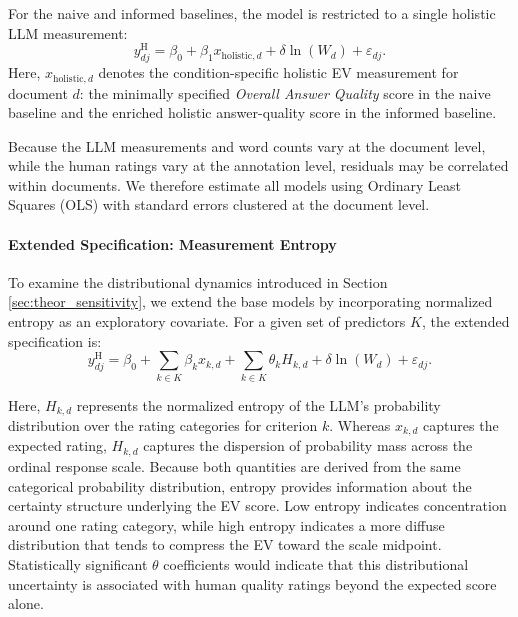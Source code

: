 For the naive and informed baselines, the model is restricted to a single holistic LLM measurement:
\begin{equation}\label{eq:feedbackqa_baseline_regression}
    y^{\text{H}}_{dj} = \beta_0 + \beta_1 x_{\text{holistic}, d} + \delta \ln(W_d) + \varepsilon_{dj}.
\end{equation}
Here, $x_{\text{holistic},d}$ denotes the condition-specific holistic EV measurement for document $d$: the minimally specified \textit{Overall Answer Quality} score in the naive baseline and the enriched holistic answer-quality score in the informed baseline.

Because the LLM measurements and word counts vary at the document level, while the human ratings vary at the annotation level, residuals may be correlated within documents. We therefore estimate all models using Ordinary Least Squares (OLS) with standard errors clustered at the document level.


\paragraph{Extended Specification: Measurement Entropy}
To examine the distributional dynamics introduced in Section \ref{sec:theor_sensitivity}, we extend the base models by incorporating normalized entropy as an exploratory covariate. For a given set of predictors $K$, the extended specification is:
\begin{equation}\label{eq:feedbackqa_extended_regression}
    y^{\text{H}}_{dj} = \beta_0 + \sum_{k \in K} \beta_k x_{k, d} + \sum_{k \in K} \theta_k H_{k, d} + \delta \ln(W_d) + \varepsilon_{dj}.
\end{equation}

Here, $H_{k,d}$ represents the normalized entropy of the LLM's probability distribution over the rating categories for criterion $k$. Whereas $x_{k,d}$ captures the expected rating, $H_{k,d}$ captures the dispersion of probability mass across the ordinal response scale. Because both quantities are derived from the same categorical probability distribution, entropy provides information about the certainty structure underlying the EV score. Low entropy indicates concentration around one rating category, while high entropy indicates a more diffuse distribution that tends to compress the EV toward the scale midpoint. Statistically significant $\theta$ coefficients would indicate that this distributional uncertainty is associated with human quality ratings beyond the expected score alone.


